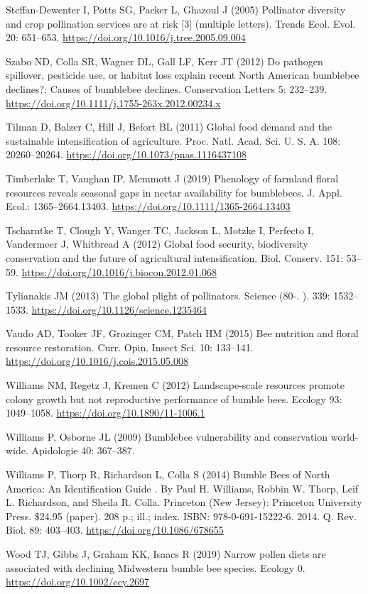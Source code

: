 \documentclass[11pt,]{article}
\begin{document}
\leavevmode\hypertarget{ref-Steffan-Dewenter2005c}{}%
Steffan-Dewenter I, Potts SG, Packer L, Ghazoul J (2005) Pollinator
diversity and crop pollination services are at risk {[}3{]} (multiple
letters). Trends Ecol. Evol. 20: 651--653.
\url{https://doi.org/10.1016/j.tree.2005.09.004}

\leavevmode\hypertarget{ref-Szabo.2012}{}%
Szabo ND, Colla SR, Wagner DL, Gall LF, Kerr JT (2012) Do pathogen
spillover, pesticide use, or habitat loss explain recent North American
bumblebee declines?: Causes of bumblebee declines. Conservation Letters
5: 232--239. \url{https://doi.org/10.1111/j.1755-263x.2012.00234.x}

\leavevmode\hypertarget{ref-Tilman2011}{}%
Tilman D, Balzer C, Hill J, Befort BL (2011) Global food demand and the
sustainable intensification of agriculture. Proc. Natl. Acad. Sci. U. S.
A. 108: 20260--20264. \url{https://doi.org/10.1073/pnas.1116437108}

\leavevmode\hypertarget{ref-Timberlake2019}{}%
Timberlake T, Vaughan IP, Memmott J (2019) Phenology of farmland floral
resources reveals seasonal gaps in nectar availability for bumblebees.
J. Appl. Ecol.: 1365--2664.13403.
\url{https://doi.org/10.1111/1365-2664.13403}

\leavevmode\hypertarget{ref-Tscharntke2012}{}%
Tscharntke T, Clough Y, Wanger TC, Jackson L, Motzke I, Perfecto I,
Vandermeer J, Whitbread A (2012) Global food security, biodiversity
conservation and the future of agricultural intensification. Biol.
Conserv. 151: 53--59. \url{https://doi.org/10.1016/j.biocon.2012.01.068}

\leavevmode\hypertarget{ref-Tylianakis2013a}{}%
Tylianakis JM (2013) The global plight of pollinators. Science (80-. ).
339: 1532--1533. \url{https://doi.org/10.1126/science.1235464}

\leavevmode\hypertarget{ref-Vaudo2015}{}%
Vaudo AD, Tooker JF, Grozinger CM, Patch HM (2015) Bee nutrition and
floral resource restoration. Curr. Opin. Insect Sci. 10: 133--141.
\url{https://doi.org/10.1016/j.cois.2015.05.008}

\leavevmode\hypertarget{ref-Williams2012b}{}%
Williams NM, Regetz J, Kremen C (2012) Landscape-scale resources promote
colony growth but not reproductive performance of bumble bees. Ecology
93: 1049--1058. \url{https://doi.org/10.1890/11-1006.1}

\leavevmode\hypertarget{ref-Williams2009}{}%
Williams P, Osborne JL (2009) Bumblebee vulnerability and conservation
world-wide. Apidologie 40: 367--387.

\leavevmode\hypertarget{ref-Williams2014}{}%
Williams P, Thorp R, Richardson L, Colla S (2014) Bumble Bees of North
America: An Identification Guide . By Paul H. Williams, Robbin W. Thorp,
Leif L. Richardson, and Sheila R. Colla. Princeton (New Jersey):
Princeton University Press. \$24.95 (paper). 208 p.; ill.; index. ISBN:
978-0-691-15222-6. 2014. Q. Rev. Biol. 89: 403--403.
\url{https://doi.org/10.1086/678655}

\leavevmode\hypertarget{ref-Wood2019}{}%
Wood TJ, Gibbs J, Graham KK, Isaacs R (2019) Narrow pollen diets are
associated with declining Midwestern bumble bee species. Ecology 0.
\url{https://doi.org/10.1002/ecy.2697}
\end{document}
